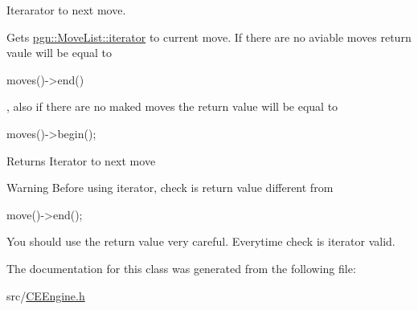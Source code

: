 Iterarator to next move. 

Gets \hyperlink{classpgn_1_1MoveList_1_1iterator}{pgn::MoveList::iterator} to current move. If there are no aviable moves return vaule will be equal to 
\begin{DoxyCode}
 moves()->end()
\end{DoxyCode}
, also if there are no maked moves the return value will be equal to 
\begin{DoxyCode}
 moves()->begin(); 
\end{DoxyCode}
 \begin{DoxyReturn}{Returns}
Iterator to next move 
\end{DoxyReturn}
\begin{DoxyWarning}{Warning}
Before using iterator, check is return value different from 
\begin{DoxyCode}
 move()->end(); 
\end{DoxyCode}
 

You should use the return value very careful. Everytime check is iterator valid. 
\end{DoxyWarning}


The documentation for this class was generated from the following file:\begin{DoxyCompactItemize}
\item 
src/\hyperlink{CEEngine_8h}{CEEngine.h}\end{DoxyCompactItemize}
